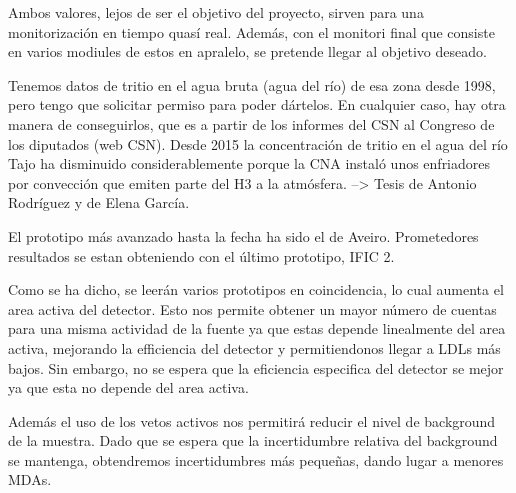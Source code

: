 Ambos valores, lejos de ser el objetivo del proyecto, sirven para una monitorización en tiempo quasí real. Además, con el monitori final que consiste en varios modiules de estos en apralelo, se pretende llegar al objetivo deseado.


Tenemos datos de tritio en el agua bruta (agua del río) de esa zona desde 1998, pero tengo que solicitar permiso para poder dártelos. En cualquier caso, hay otra manera de conseguirlos, que es a partir  de los informes del CSN al Congreso de los diputados (web CSN).
Desde 2015 la concentración de tritio en el agua del río Tajo ha disminuido considerablemente porque la CNA instaló unos enfriadores por convección que emiten parte del H3 a la atmósfera. --> Tesis de Antonio Rodríguez y de Elena García.

El prototipo más avanzado hasta la fecha ha sido el de Aveiro. Prometedores resultados se estan obteniendo con el último prototipo, IFIC 2.

Como se ha dicho, se leerán varios prototipos en coincidencia, lo cual aumenta el area activa del detector. Esto nos permite obtener un mayor número de cuentas para una misma actividad de la fuente ya que estas depende linealmente del area activa, mejorando la efficiencia del detector y permitiendonos llegar a LDLs más bajos. Sin embargo, no se espera que la eficiencia especifica del detector se mejor ya que esta no depende del area activa.

Además el uso de los vetos activos nos permitirá reducir el nivel de background de la muestra. Dado que se espera que la incertidumbre relativa del background se mantenga, obtendremos incertidumbres más pequeñas, dando lugar a menores MDAs.

